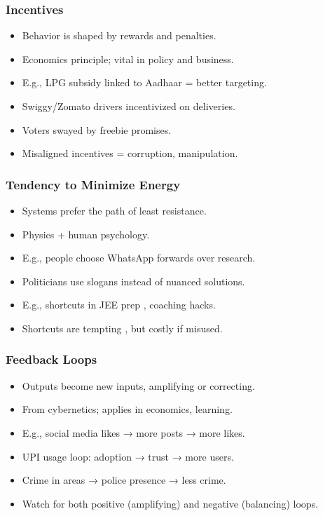 \begin{frame}[fragile]\frametitle{Incentives}
  \begin{itemize}
    \item Behavior is shaped by rewards and penalties.
    \item Economics principle; vital in policy and business.
    \item E.g., LPG subsidy linked to Aadhaar = better targeting.
    \item Swiggy/Zomato drivers incentivized on deliveries.
    \item Voters swayed by freebie promises.
    \item Misaligned incentives = corruption, manipulation.
  \end{itemize}
\end{frame}

\begin{frame}[fragile]\frametitle{Tendency to Minimize Energy}
  \begin{itemize}
    \item Systems prefer the path of least resistance.
    \item Physics + human psychology.
    \item E.g., people choose WhatsApp forwards over research.
    \item Politicians use slogans instead of nuanced solutions.
    \item E.g., shortcuts in JEE prep , coaching hacks.
    \item Shortcuts are tempting , but costly if misused.
  \end{itemize}
\end{frame}

\begin{frame}[fragile]\frametitle{Feedback Loops}
  \begin{itemize}
    \item Outputs become new inputs, amplifying or correcting.
    \item From cybernetics; applies in economics, learning.
    \item E.g., social media likes → more posts → more likes.
    \item UPI usage loop: adoption → trust → more users.
    \item Crime in areas → police presence → less crime.
    \item Watch for both positive (amplifying) and negative (balancing) loops.
  \end{itemize}
\end{frame}

